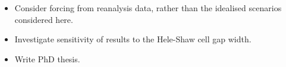\documentclass[landscape,24pt, a0paper,colspace=10mm,blockverticalspace=12mm]{tikzposter}
\begin{document}
\begin{columns}
\begin{subcolumns}
{}
 

 
{
\begin{itemize}
\item Consider forcing from reanalysis data, rather than the idealised scenarios considered here.
\item Investigate sensitivity of results to the Hele-Shaw cell gap width.
\item Write PhD thesis.
\end{itemize}
}

 
\end{subcolumns}

\end{columns}
\end{document}
